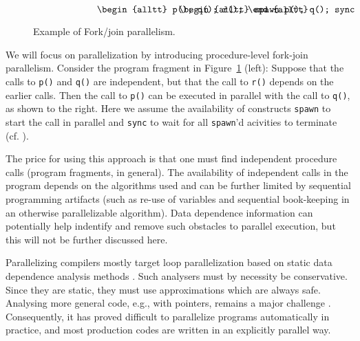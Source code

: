 \documentclass{acm_proc_article-sp}
\begin{document}
\begin{figure}
\small
\hrulefill
\[
\begin{minipage}[t]{3cm}
\begin{alltt}
   p();
   q();
   r();
\end{alltt}
\end{minipage}
\begin{minipage}[t]{3cm}
\begin{alltt}
   spawn p();
   q();
   sync;
   r();
\end{alltt}
\end{minipage} 
\]
\hrulefill
\caption{Example of Fork/join parallelism.}
\label{fforkjoin}
\end{figure}

We will focus on parallelization by introducing procedure-level
fork-join parallelism.  Consider the program fragment in
Figure~\ref{fforkjoin} (left):
Suppose that the calls to {\tt p()} and {\tt q()} are independent,
but that the call to {\tt r()} depends on the earlier calls. Then
the call to {\tt p()} can be
executed in parallel with
the call to {\tt q()}, as shown to the right.
Here we assume the availability of constructs {\tt spawn} to start
the call in parallel and {\tt sync} to wait for all {\tt spawn}'d
acivities to terminate (cf. \cite{BJKLR96,frigo98implementation}).

The price for using this approach is that one must find independent
procedure calls (program fragments, in general).  The availability 
of independent
calls in the program depends on the algorithms used and can be further
limited by sequential programming artifacts (such as re-use of
variables and sequential book-keeping in an otherwise parallelizable
algorithm).  Data dependence information can potentially help
indentify and remove such obstacles to parallel execution, but this
will not be further discussed here.

Parallelizing compilers mostly target loop parallelization based on
static data dependence analysis methods \cite{}.  Such analysers must
by necessity be conservative.  Since they are static, they must use
approximations which are always safe.  
Analysing more general code, e.g., with pointers, remains a major
challenge \cite{}.  Consequently, it has proved difficult to
parallelize programs automatically in practice, and most production
codes are written in an explicitly parallel way.
\end{document}
